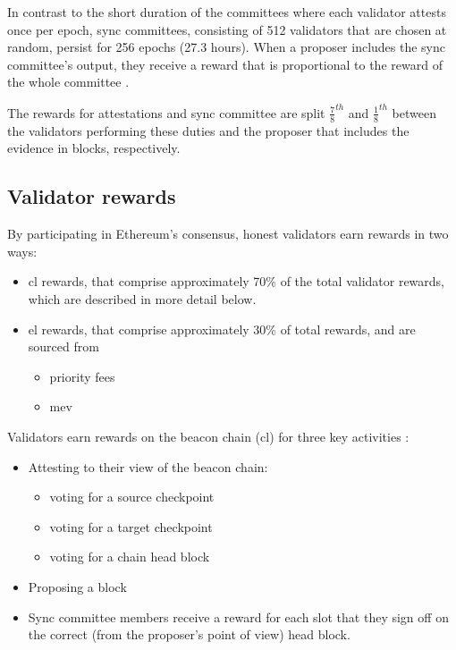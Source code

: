 \documentclass[UTF8]{article}
\begin{document}
{In contrast to the short duration of the committees where each validator attests once per epoch, sync committees, consisting of 512 validators that are chosen at random, persist for 256 epochs (27.3 hours).  When a proposer includes the sync committee's output, they receive a reward that is proportional to the reward of the whole committee \cite{Edgington2023}.

The rewards for attestations and sync committee are split $\frac{7}{8}^{th}$ and $\frac{1}{8}^{th}$ between the validators performing these duties and the proposer that includes the evidence in blocks, respectively.


\subsection{Validator rewards}
\label{rewards}

By participating in Ethereum’s consensus, honest validators earn rewards in two ways\cite{breslina}:
\begin{itemize}
\item \gls{cl} rewards, that comprise approximately 70\% of the total validator rewards, which are described in more detail below.
\item \gls{el} rewards, that comprise approximately 30\% of total rewards, and are sourced from
	\begin{itemize}
	\item priority fees
	\item \gls{mev}
	\end{itemize}

\end{itemize}

Validators earn rewards on the beacon chain (\gls{cl}) for three key activities \cite{Edgington2023}:
\begin{itemize}
\item Attesting to their view of the beacon chain:
	\begin{itemize}
	\item voting for a source checkpoint
	\item voting for a target checkpoint
	\item voting for a chain head block
	\end{itemize}
\item Proposing a block	
\item Sync committee members receive a reward for each slot that they sign off on the correct (from the proposer's point of view) head block.
\end{itemize}

}
\end{document}
